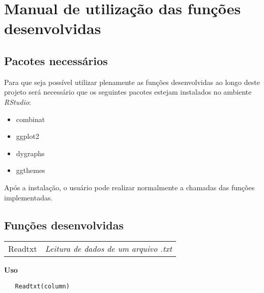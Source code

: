 \chapter{Manual de utilização das funções desenvolvidas} \label{apendiceA}

\section{Pacotes necessários}

Para que seja possível utilizar plenamente as funções desenvolvidas ao longo deste projeto será necessário que os seguintes pacotes estejam instalados no ambiente \textit{RStudio}:

\begin{itemize}
\item combinat
\item ggplot2
\item dygraphs
\item ggthemes
\end{itemize}

Após a instalação, o usuário pode realizar normalmente a chamadas das funções implementadas.

\section{Funções desenvolvidas}


\hrulefill   

\begin{table}[!ht]
\begin{center}
\begin{tabularx}{\textwidth}{ X X}
\hspace{0.5cm} Readtxt & \textit{Leitura de dados de um arquivo .txt}\\
\end{tabularx}
\end{center}
\end{table} 

\vspace{-0.5cm}

\hrulefill  

\vspace{0.5cm}

\textbf{Uso}

\begin{lstlisting}
   Readtxt(column)
\end{lstlisting}

